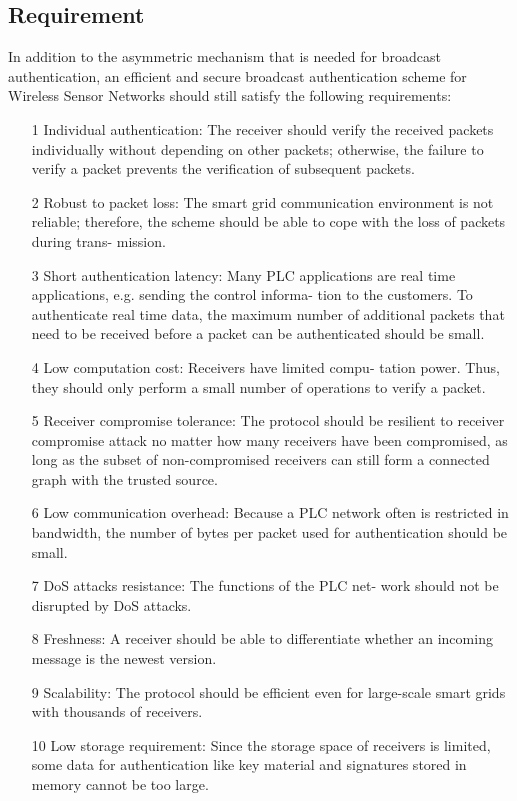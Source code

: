 \documentclass{sig-alternate-05-2015}
\begin{document}
\subsection{Requirement}
In addition to the asymmetric mechanism that is needed for broadcast authentication, an efficient and secure broadcast authentication scheme for Wireless Sensor Networks should still satisfy the following requirements:

\begin{itemize}
\item[1] Individual authentication: The receiver should verify the received packets individually without depending on other packets; otherwise, the failure to verify a packet prevents the verification of subsequent packets.

\item[2] Robust to packet loss: The smart grid communication environment is not reliable; therefore, the scheme should be able to cope with the loss of packets during trans- mission.

\item[3] Short authentication latency: Many PLC applications are real time applications, e.g. sending the control informa- tion to the customers. To authenticate real time data, the maximum number of additional packets that need to be received before a packet can be authenticated should be small.

\item[4] Low computation cost: Receivers have limited compu- tation power. Thus, they should only perform a small number of operations to verify a packet.

\item[5] Receiver compromise tolerance: The protocol should be resilient to receiver compromise attack no matter how many receivers have been compromised, as long as the subset of non-compromised receivers can still form a connected graph with the trusted source.

\item[6] Low communication overhead: Because a PLC network often is restricted in bandwidth, the number of bytes per packet used for authentication should be small.

\item[7] DoS attacks resistance: The functions of the PLC net- work should not be disrupted by DoS attacks.

\item[8] Freshness: A receiver should be able to differentiate whether an incoming message is the newest version.

\item[9] Scalability: The protocol should be efficient even for large-scale smart grids with thousands of receivers.

\item[10] Low storage requirement: Since the storage space of receivers is limited, some data for authentication like key material and signatures stored in memory cannot be too large.
\end{itemize}
\end{document}
